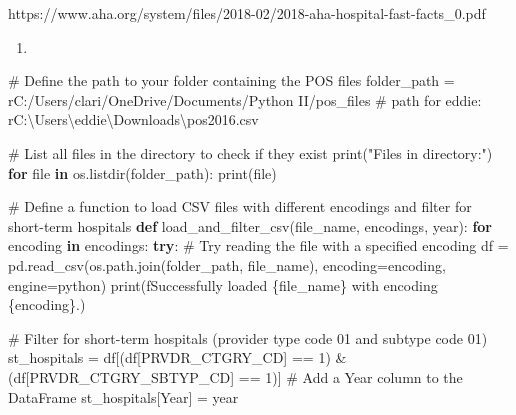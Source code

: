 \documentclass[
  letterpaper,
  DIV=11,
  numbers=noendperiod]{scrartcl}
\newenvironment{Shaded}{\begin{snugshade}}{\end{snugshade}}
\newcommand{\BuiltInTok}[1]{\textcolor[rgb]{0.00,0.23,0.31}{#1}}
\newcommand{\CommentTok}[1]{\textcolor[rgb]{0.37,0.37,0.37}{#1}}
\newcommand{\ControlFlowTok}[1]{\textcolor[rgb]{0.00,0.23,0.31}{\textbf{#1}}}
\newcommand{\DecValTok}[1]{\textcolor[rgb]{0.68,0.00,0.00}{#1}}
\newcommand{\KeywordTok}[1]{\textcolor[rgb]{0.00,0.23,0.31}{\textbf{#1}}}
\newcommand{\NormalTok}[1]{\textcolor[rgb]{0.00,0.23,0.31}{#1}}
\newcommand{\OperatorTok}[1]{\textcolor[rgb]{0.37,0.37,0.37}{#1}}
\newcommand{\SpecialCharTok}[1]{\textcolor[rgb]{0.37,0.37,0.37}{#1}}
\newcommand{\SpecialStringTok}[1]{\textcolor[rgb]{0.13,0.47,0.30}{#1}}
\newcommand{\StringTok}[1]{\textcolor[rgb]{0.13,0.47,0.30}{#1}}
\newcommand{\VerbatimStringTok}[1]{\textcolor[rgb]{0.13,0.47,0.30}{#1}}
\providecommand{\tightlist}{%
  \setlength{\itemsep}{0pt}\setlength{\parskip}{0pt}}\usepackage{longtable,booktabs,array}
\begin{document}
https://www.aha.org/system/files/2018-02/2018-aha-hospital-fast-facts\_0.pdf

\begin{enumerate}
\def\labelenumi{\arabic{enumi}.}
\setcounter{enumi}{2}
\tightlist
\item
\end{enumerate}

\begin{Shaded}
\begin{Highlighting}[]
\CommentTok{\# Define the path to your folder containing the POS files}
\NormalTok{folder\_path }\OperatorTok{=} \VerbatimStringTok{r\textquotesingle{}C:/Users/clari/OneDrive/Documents/Python II/pos\_files\textquotesingle{}}
\CommentTok{\# path for eddie: r\textquotesingle{}C:\textbackslash{}Users\textbackslash{}eddie\textbackslash{}Downloads\textbackslash{}pos2016.csv\textquotesingle{}}

\CommentTok{\# List all files in the directory to check if they exist}
\BuiltInTok{print}\NormalTok{(}\StringTok{"Files in directory:"}\NormalTok{)}
\ControlFlowTok{for} \BuiltInTok{file} \KeywordTok{in}\NormalTok{ os.listdir(folder\_path):}
    \BuiltInTok{print}\NormalTok{(}\BuiltInTok{file}\NormalTok{)}

\CommentTok{\# Define a function to load CSV files with different encodings and filter for short{-}term hospitals}
\KeywordTok{def}\NormalTok{ load\_and\_filter\_csv(file\_name, encodings, year):}
    \ControlFlowTok{for}\NormalTok{ encoding }\KeywordTok{in}\NormalTok{ encodings:}
        \ControlFlowTok{try}\NormalTok{:}
            \CommentTok{\# Try reading the file with a specified encoding}
\NormalTok{            df }\OperatorTok{=}\NormalTok{ pd.read\_csv(os.path.join(folder\_path, file\_name),}
\NormalTok{                             encoding}\OperatorTok{=}\NormalTok{encoding, engine}\OperatorTok{=}\StringTok{\textquotesingle{}python\textquotesingle{}}\NormalTok{)}
            \BuiltInTok{print}\NormalTok{(}\SpecialStringTok{f\textquotesingle{}Successfully loaded }\SpecialCharTok{\{}\NormalTok{file\_name}\SpecialCharTok{\}}\SpecialStringTok{ with encoding }\SpecialCharTok{\{}\NormalTok{encoding}\SpecialCharTok{\}}\SpecialStringTok{.\textquotesingle{}}\NormalTok{)}

            \CommentTok{\# Filter for short{-}term hospitals (provider type code 01 and subtype code 01)}
\NormalTok{            st\_hospitals }\OperatorTok{=}\NormalTok{ df[(df[}\StringTok{\textquotesingle{}PRVDR\_CTGRY\_CD\textquotesingle{}}\NormalTok{] }\OperatorTok{==} \DecValTok{1}\NormalTok{) }\OperatorTok{\&}
\NormalTok{                              (df[}\StringTok{\textquotesingle{}PRVDR\_CTGRY\_SBTYP\_CD\textquotesingle{}}\NormalTok{] }\OperatorTok{==} \DecValTok{1}\NormalTok{)]}
            \CommentTok{\# Add a \textquotesingle{}Year\textquotesingle{} column to the DataFrame}
\NormalTok{            st\_hospitals[}\StringTok{\textquotesingle{}Year\textquotesingle{}}\NormalTok{] }\OperatorTok{=}\NormalTok{ year}


\end{Highlighting}
\end{Shaded}
\end{document}
